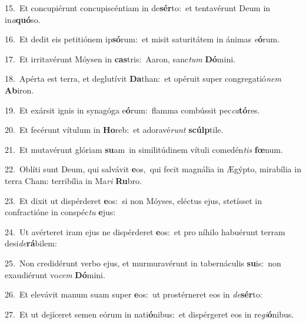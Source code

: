 {\numbfont\textcolor{\numbcolor}{15.}}~Et concupiérunt concupiscéntiam in de\-\textbf{sér}\-to:~\star et tentavérunt Deum in in\-\textit{a}\-\textbf{quó}so.\par
{\numbfont\textcolor{\numbcolor}{16.}}~Et dedit eis petitiónem ip\-\textbf{só}\-rum:~\star et misit saturitátem in ánimas \textit{e}\-\textbf{ó}rum.\par
{\numbfont\textcolor{\numbcolor}{17.}}~Et irritavérunt Móysen in \textbf{cas}\-tris:~\star Aaron, sanc\textit{tum} \textbf{Dó}\-mini.\par
{\numbfont\textcolor{\numbcolor}{18.}}~Apérta est terra, et deglutívit \textbf{Da}\-than:~\star et opéruit super congregatió\textit{nem} \textbf{Ab}\-iron.\par
{\numbfont\textcolor{\numbcolor}{19.}}~Et exársit ignis in synagóga e\-\textbf{ó}\-rum:~\star flamma combússit pec\-\textit{ca}\-\textbf{tó}res.\par
{\numbfont\textcolor{\numbcolor}{20.}}~Et fecérunt vítulum in \textbf{Ho}\-reb:~\star et adoravé\textit{runt} \textbf{scúlp}\-tile.\par
{\numbfont\textcolor{\numbcolor}{21.}}~Et mutavérunt glóriam \textbf{su}\-am~\star in similitúdinem vítuli comedén\textit{tis} \textbf{fœ}\-num.\par
{\numbfont\textcolor{\numbcolor}{22.}}~Oblíti sunt Deum, qui salvávit \textbf{e}\-os,~\star qui fecit magnália in Ægýpto, mirabília in terra Cham: terribília in Ma\textit{ri} \textbf{Ru}\-bro.\par
{\numbfont\textcolor{\numbcolor}{23.}}~Et dixit ut dispérderet \textbf{e}\-os:~\star si non Móyses, eléctus ejus, stetísset in confractióne in conspéc\textit{tu} \textbf{e}\-jus:\par
{\numbfont\textcolor{\numbcolor}{24.}}~Ut avérteret iram ejus ne dispérderet \textbf{e}\-os:~\star et pro níhilo habuérunt terram desi\-\textit{de}\-\textbf{rá}bilem:\par
{\numbfont\textcolor{\numbcolor}{25.}}~Non credidérunt verbo ejus, et murmuravérunt in tabernáculis \textbf{su}\-is:~\star non exaudiérunt vo\textit{cem} \textbf{Dó}\-mini.\par
{\numbfont\textcolor{\numbcolor}{26.}}~Et elevávit manum suam super \textbf{e}\-os:~\star ut prostérneret eos in \textit{de}\-\textbf{sér}to:\par
{\numbfont\textcolor{\numbcolor}{27.}}~Et ut dejíceret semen eórum in nati\-\textbf{ó}\-nibus:~\star et dispérgeret eos in re\-\textit{gi}\-\textbf{ó}nibus.\par
